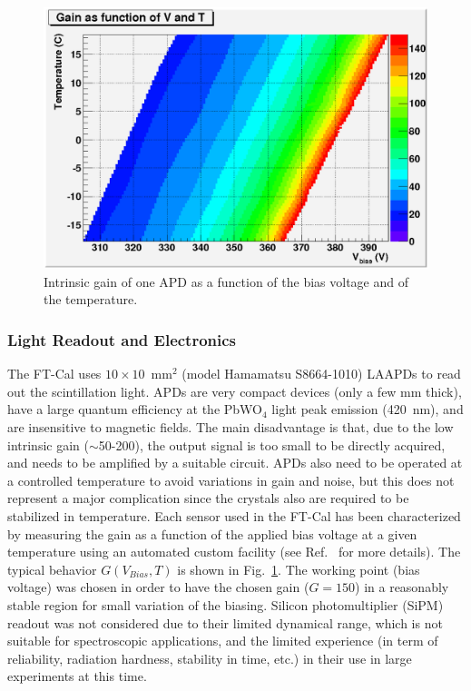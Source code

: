\begin{figure}[th!]
\centering 
\includegraphics[width=1.0\columnwidth]{./fig/apd5.eps} 
\caption{Intrinsic gain of one APD as a function of the bias voltage and of the temperature.}
\label{fig:G-V-T} 
\end{figure}

\subsubsection{Light Readout and Electronics}
\label{sec:ftcalread}

The FT-Cal uses $10 \times 10$~mm$^2$ (model Hamamatsu S8664-1010) LAAPDs to read out the scintillation
light. APDs are very compact devices (only a few mm thick), have a large quantum efficiency at the PbWO$_4$
light peak emission (420~nm), and  are insensitive to magnetic fields. The main disadvantage is that, due to the
low intrinsic gain ($\sim$50-200), the output signal is too small to be directly acquired, and needs to be amplified
by a suitable circuit. APDs also need to be operated at a controlled temperature to avoid variations in gain and noise,
but this does not represent a major complication since the crystals also are required to be stabilized in temperature.
Each sensor used in the FT-Cal has been characterized by measuring the gain as a function of the applied bias voltage
at a given temperature using an automated  custom facility (see Ref.~\cite{celeAPD} for more details). The typical
behavior $G(V_{Bias},T)$ is shown in Fig.~\ref{fig:G-V-T}. The working point (bias voltage) was chosen in order to
have the chosen gain ($G=150$) in a reasonably stable region for small variation of the biasing. Silicon photomultiplier
(SiPM) readout was not considered due to their limited dynamical range, which is not suitable for spectroscopic
applications, and the limited experience (in term of reliability, radiation hardness, stability in time, etc.) in their use
in large experiments at this time.

